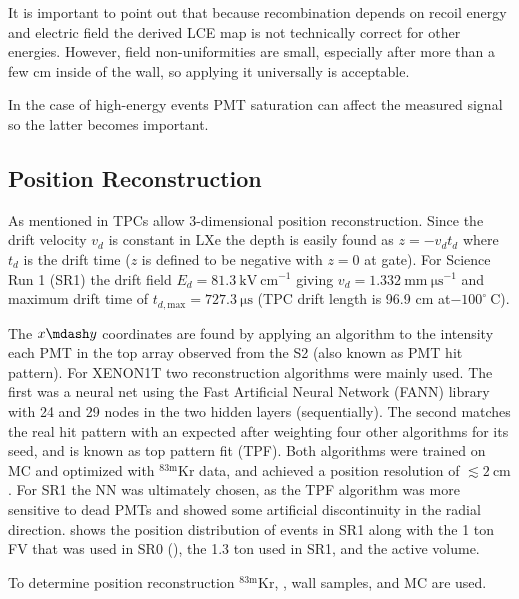 {It is important to point out that because recombination depends on recoil energy and electric field the derived LCE map is not
technically correct for other energies.  However, field non-uniformities are small, especially after more than a few cm inside of the
wall, so applying it universally is acceptable.

In the case of high-energy events PMT saturation can
affect the measured signal so the latter becomes important.



\subsection{Position Reconstruction}
\label{subsec:det_char_position_reconstruction}
As mentioned in  TPCs allow 3-dimensional position reconstruction.  Since the drift velocity $v_d$
is constant in LXe the depth is easily found as $z = -v_d t_d$ where $t_d$ is the drift time ($z$ is defined to be negative with
$z = 0$ at gate).  For Science Run 1 (SR1) the drift field $E_d = 81.3\ \mathrm{kV\ cm^{-1}}$ giving
$v_d = 1.332\ \mathrm{mm\ \mu s^{-1}}$ and maximum drift time of $t_{d, \mathrm{max}} = 727.3\ \mathrm{\mu s}$ (TPC drift length is 96.9
cm at$-100^{\circ}\ \mathrm{C}$).

The $x \mdash y$ coordinates are found by applying an algorithm to the intensity each PMT in the top array observed from the S2 (also known as
PMT hit pattern).  For XENON1T two reconstruction algorithms were mainly used.  The first was a neural net using the Fast Artificial
Neural Network (FANN) library with 24 and 29 nodes in the two hidden layers (sequentially).  The second matches the real hit pattern with
an expected after weighting four other algorithms for its seed, and is known as top pattern fit (TPF).  Both algorithms were trained on MC
and optimized with $\mathrm{^{83m}Kr}$ data, and achieved a position resolution of $\lesssim 2\ \mathrm{cm}$.  For SR1 the NN was ultimately
chosen, as the TPF algorithm was more sensitive to dead PMTs and showed some artificial discontinuity in the radial
direction.   shows the position distribution of events in SR1 along with the 1 ton FV
that was used in SR0 (), the 1.3 ton used in SR1, and the active volume.

To determine position reconstruction $\mathrm{^{83m}Kr}$, , wall samples, and MC are used.

}
